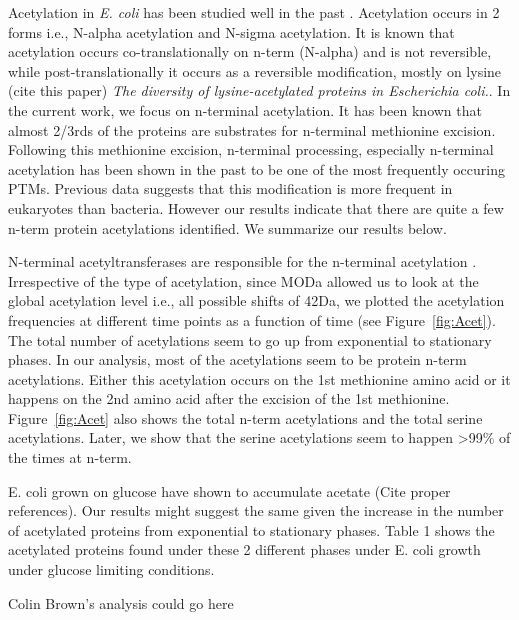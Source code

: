 \documentclass[12pt]{article}
\begin{document}
Acetylation in \emph{E. coli} has been studied well in the past \cite{Charbautetal2002} \cite{Gordiyenkoetal2008}. Acetylation occurs in 2 forms i.e., N-{alpha} acetylation and N-{sigma} acetylation. It is known that acetylation occurs co-translationally on n-term (N-{alpha}) and is not reversible, while post-translationally it occurs as a reversible modification, mostly on lysine  (cite this paper) \emph{The diversity of lysine-acetylated proteins in Escherichia coli.}. In the current work, we focus on n-terminal acetylation. It has been known that almost 2/3rds of the proteins are substrates for n-terminal methionine excision. Following this methionine excision, n-terminal processing, especially n-terminal acetylation \cite{Driessenetal1985} has been shown in the past to be one of the most frequently occuring PTMs. Previous data suggests that this modification is more frequent in eukaryotes than bacteria. However our results indicate that there are quite a few n-term protein acetylations identified. We summarize our results below. 

N-terminal acetyltransferases are responsible for the n-terminal acetylation \cite{Starheimetal2012}.  Irrespective of the type of acetylation, since MODa allowed us to look at the global acetylation level i.e., all possible shifts of 42Da, we plotted the acetylation frequencies at different time points as a function of time (see Figure~\ref{fig:Acet}). The total number of acetylations seem to go up from exponential to stationary phases. In our analysis, most of the acetylations seem to be protein n-term acetylations. Either this acetylation occurs on the 1st methionine amino acid or it happens on the 2nd amino acid after the excision of the 1st methionine. Figure~\ref{fig:Acet} also shows the total n-term acetylations and the total serine acetylations. Later, we show that the serine acetylations seem to happen >99\% of the times at n-term.

E. coli grown on glucose have shown to accumulate acetate (Cite proper references). Our results might suggest the same given the increase in the number of acetylated proteins from exponential to stationary phases. Table 1 shows the acetylated proteins found under these 2 different phases under E. coli growth under glucose limiting conditions.

{Colin Brown's analysis could go here}

\end{document}
